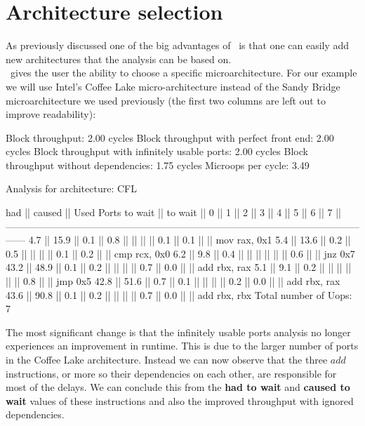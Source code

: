 \FloatBarrier

\section{Architecture selection}

As previously discussed one of the big advantages of \suaca\ is that one can easily add new architectures that the analysis can be based on.\\
\suaca\ gives the user the ability to choose a specific microarchitecture. For our example we will use Intel's Coffee Lake micro-architecture instead of the Sandy Bridge microarchitecture we used previously (the first two columns are left out to improve readability):\\

\begin{example}
Block throughput: 2.00 cycles
Block throughput with perfect front end: 2.00 cycles
Block throughput with infinitely usable ports: 2.00 cycles
Block throughput without dependencies: 1.75 cycles
Microops per cycle: 3.49

Analysis for architecture: CFL

   had   || caused  ||            Used Ports
 to wait || to wait ||   0   ||   1   ||   2   ||   3   ||   4   ||   5   ||   6   ||   7   ||
------------------------------------------------------------------------------------------------------------------
   4.7   ||  15.9   ||  0.1  ||  0.8  ||       ||       ||       ||  0.1  ||  0.1  ||       || mov rax, 0x1
   5.4   ||  13.6   ||  0.2  ||  0.5  ||       ||       ||       ||  0.1  ||  0.2  ||       || cmp rcx, 0x0
   6.2   ||   9.8   ||  0.4  ||       ||       ||       ||       ||       ||  0.6  ||       || jnz 0x7
  43.2   ||  48.9   ||  0.1  ||  0.2  ||       ||       ||       ||  0.7  ||  0.0  ||       || add rbx, rax
   5.1   ||   9.1   ||  0.2  ||       ||       ||       ||       ||       ||  0.8  ||       || jmp 0x5
  42.8   ||  51.6   ||  0.7  ||  0.1  ||       ||       ||       ||  0.2  ||  0.0  ||       || add rbx, rax
  43.6   ||  90.8   ||  0.1  ||  0.2  ||       ||       ||       ||  0.7  ||  0.0  ||       || add rbx, rbx
Total number of Uops: 7
\end{example}

The most significant change is that the infinitely usable ports analysis no longer experiences an improvement in runtime. This is due to the larger number of ports in the Coffee Lake architecture. Instead we can now observe that the three $add$ instructions, or more so their dependencies on each other, are responsible for most of the delays. We can conclude this from the \textbf{had to wait} and \textbf{caused to wait} values of these instructions and also the improved throughput with ignored dependencies.



